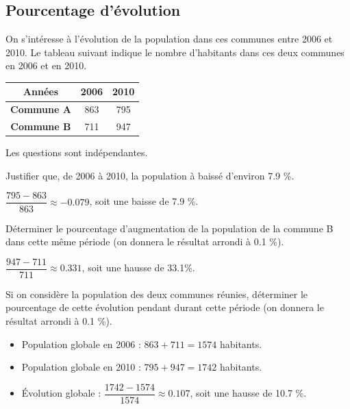 \documentclass[a4paper,11pt]{exam}
\begin{document}
\subsection{Pourcentage d'évolution}

\begin{multicols}{2}

\vspace*{0.1cm}	
On s'intéresse à l'évolution de la population dans ces communes entre 2006 et 2010. Le tableau suivant indique le nombre d'habitants dans ces deux communes en 2006 et en 2010. 



	\begin{tabular}{|@{\ }c@{\ }|@{\ }c@{\ }|@{\ }c@{\ }|}
		\hline
		\textbf{Années} & \textbf{2006} & \textbf{2010}\\
		\hline
		\textbf{Commune A} & \num{863} & \num{795}  \\
		\hline 
		\textbf{Commune B} & \num{711} & \num{947}  \\
		\hline
	\end{tabular}

\end{multicols}	

Les questions sont indépendantes.

\begin{questions}
	\question Justifier que, de 2006 à 2010, la population à baissé d'environ \num{7.9} \%.
	\begin{solution}
		$\dfrac{795 - 863}{863} \approx \num{-0.079} $, soit une baisse de \num{7.9} \%.
	\end{solution}
	
	\question Déterminer le pourcentage d'augmentation de la population de la commune B dans cette même période (on donnera le résultat arrondi à \num{0.1} \%).
	\begin{solution}
		$\dfrac{947-711}{711}\approx \num{0.331}$, soit une hausse de \num{33.1}\%.
	\end{solution}
	
	\question Si on considère la population des deux communes réunies, déterminer le pourcentage de cette évolution pendant durant cette période (on donnera le résultat arrondi à \num{0.1} \%).
	\begin{solution}
		\begin{itemize}
			\item Population globale en 2006 : $863 + 711 = 1574$ habitants.
			\item Population globale en 2010 : $795 + 947 = 1742$ habitants.
			\item \'Evolution globale : $\dfrac{1742-1574}{1574} \approx \num{0.107}$, soit une hausse de \num{10.7} \%.
		\end{itemize}
	\end{solution}
	
\end{questions}
\end{document}
